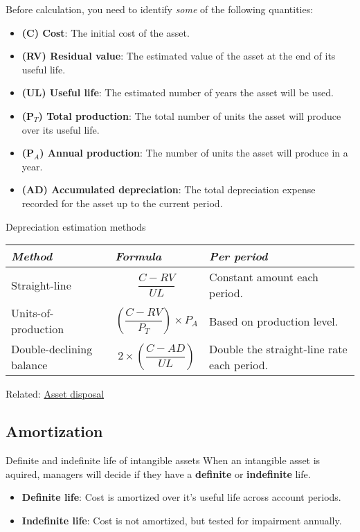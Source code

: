 Before calculation, you need to identify \textit{some} of the following quantities:
\begin{itemize}
    \item \textbf{(C) Cost}: The initial cost of the asset.
    \item \textbf{(RV) Residual value}: The estimated value of the asset at the end of its useful life.
    \item \textbf{(UL) Useful life}: The estimated number of years the asset will be used.
    \item \textbf{(P$_T$) Total production}: The total number of units the asset will produce over its useful life.
    \item \textbf{(P$_A$) Annual production}: The number of units the asset will produce in a year.
    \item \textbf{(AD) Accumulated depreciation}: The total depreciation expense recorded for the asset up to the current period.
\end{itemize}

\begin{theorem}
    {Depreciation estimation methods}
    \begin{tabular}{|p{}|p{}|p{}|}
        \hline
        \textit{Method}          & \textit{Formula}                                 & \textit{Per period}                        \\
        \hline
        Straight-line            & \[\frac{C - RV}{UL}\]                            & Constant amount each period.               \\
        \hline
        Units-of-production      & \[\left( \frac{C - RV}{P_T} \right) \times P_A\] & Based on production level.                 \\
        \hline
        Double-declining balance & \[2 \times \left( \frac{C - AD}{UL} \right)\]    & Double the straight-line rate each period. \\
        \hline
    \end{tabular}
\end{theorem}

Related: \hyperref[subsec:asset_disposal]{Asset disposal}

\subsection{Amortization}

\begin{definition}
    {Definite and indefinite life of intangible assets}
    When an intangible asset is aquired, managers will decide if they have a \textbf{definite} or \textbf{indefinite} life.
    \begin{itemize}
        \item \textbf{Definite life}: Cost is amortized over it's useful life across account periods.
        \item \textbf{Indefinite life}: Cost is not amortized, but tested for impairment annually.
    \end{itemize}
\end{definition}

